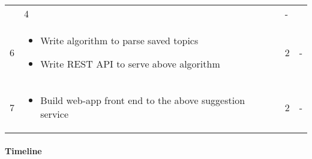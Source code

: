 \begin{table*}[t]
\begin{tabular}{ l p{10cm} l l}
\begin{itemize}
        \end{itemize} &
                        4 & - \\
    6 &
        \begin{itemize}
        \item Write algorithm to parse saved topics
        \item Write REST API to serve above algorithm
        \end{itemize} &
                        2 & - \\
    7 &
        \begin{itemize}
        \item Build web-app front end to the above suggestion service
        \end{itemize} &
                        2 & - 
  \end{tabular} \label{sec:planning:prototypes-table}
\end{table*}

\paragraph{Timeline}

